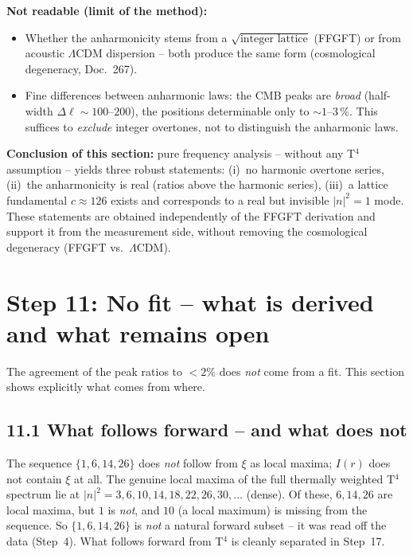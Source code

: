 \textbf{Not readable (limit of the method):}
\begin{itemize}
  \item Whether the anharmonicity stems from a
        $\sqrt{\text{integer lattice}}$ (FFGFT) or from acoustic
        $\Lambda$CDM dispersion -- both produce the same form
        (cosmological degeneracy, Doc.~267).
  \item Fine differences between anharmonic laws: the CMB peaks are
        \emph{broad} (half-width $\Delta\ell \sim 100$--$200$), the
        positions determinable only to $\sim 1$--$3\,\%$. This suffices
        to \emph{exclude} integer overtones, not to distinguish the
        anharmonic laws.
\end{itemize}

\textbf{Conclusion of this section:} pure frequency analysis -- without
any T$^4$ assumption -- yields three robust statements: (i)~no harmonic
overtone series, (ii)~the anharmonicity is real (ratios above the
harmonic series), (iii)~a
lattice fundamental $c \approx 126$ exists and corresponds to a real
but invisible $|n|^2{=}1$ mode. These statements are obtained
independently of the FFGFT derivation and support it from the
measurement side, without removing the cosmological degeneracy (FFGFT
vs.\ $\Lambda$CDM).

\section{Step 11: No fit -- what is derived and what remains open}

The agreement of the peak ratios to $< 2\%$ does \emph{not} come from
a fit. This section shows explicitly what comes from where.

\subsection*{11.1 What follows forward -- and what does not}

\begin{tcolorbox}[colback=red!4!white, colframe=red!55!black,
  title={Reading of the sequence $\{1,6,14,26\}$}]
The sequence $\{1,6,14,26\}$ does \emph{not} follow from $\xi$ as local
maxima; $I(r)$ does not contain $\xi$ at all. The genuine local maxima
of the full thermally weighted T$^4$ spectrum lie at
$|n|^2 = 3, 6, 10, 14, 18, 22, 26, 30, \ldots$ (dense). Of these, $6,14,26$
are local maxima, but $1$ is \emph{not}, and $10$ (a local maximum) is missing
from the sequence. So $\{1,6,14,26\}$ is \emph{not} a natural forward subset --
it was read off the data (Step~4). What follows forward from T$^4$ is cleanly
separated in Step~17.
\end{tcolorbox}

